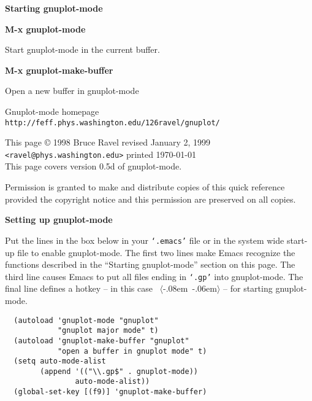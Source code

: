 \documentclass[twocolumn]{article}
\newenvironment{Boxedminipage}%
{\begin{Sbox}\begin{minipage}}%
  {\end{minipage}\end{Sbox}\Ovalbox{\TheSbox}}
\newenvironment{SqBoxedminipage}%
{\begin{Sbox}\begin{minipage}}%
  {\end{minipage}\end{Sbox}\fbox{\TheSbox}}
\def\version{{0.5d}}
\def\revised{{January 2, 1999}}
\def\file#1{{\texttt{`#1'}}}
\def\key#1{{\textrm \leavevmode\hbox{%
  \raise0.4pt\hbox{$\langle$}\kern-.08em\vtop{%
    \vbox{\hrule\kern-0.4pt
     \hbox{\raise0.4pt\hbox{\vphantom{$\langle$}}#1}}%
    \kern-0.4pt\hrule}%
  \kern-.06em\raise0.4pt\hbox{$\rangle$}}}}
\def\command#1#2{{
    \vspace{-0.2truecm}
    \begin{flushright}
      \begin{minipage}[h]{0.97\linewidth}
        \vspace{-0.2truecm}
        \textbf{#1}\hfill
        \begin{flushright}
          \begin{minipage}[h]{0.93\linewidth}
            \vspace{-0.4truecm}
            #2
          \end{minipage}
        \end{flushright}
      \end{minipage}
    \end{flushright}
    }}
\begin{document}
\vspace{4ex}

\centerline{{\large\textbf{Starting gnuplot-mode}}}
\vspace{2ex}

\command{M-x gnuplot-mode}{Start gnuplot-mode in the current buffer.}
%
\command{M-x gnuplot-make-buffer}{Open a new buffer in gnuplot-mode}



\vfill

\begin{Boxedminipage}{0.98\linewidth}
  \begin{center}
    \footnotesize{
      Gnuplot-mode homepage \\
      \texttt{http://feff.phys.washington.edu/\char126ravel/gnuplot/}}
  \end{center}
\end{Boxedminipage}
\begin{flushleft}
  {\footnotesize
    This page {\copyright} 1998 Bruce Ravel \hfill revised \revised \\
    \texttt{<ravel@phys.washington.edu>} \hfill printed \today \\
    This page covers version {\version} of gnuplot-mode.

    Permission is granted to make and distribute copies of this quick
    reference provided the copyright notice and this permission are
    preserved on all copies.}
\end{flushleft}
\pagebreak
\centerline{{\large\textbf{Setting up gnuplot-mode}}}
\vspace{2ex}

Put the lines in the box below in your \file{.emacs} file or in the
system wide start-up file to enable gnuplot-mode.  The first two lines
make Emacs recognize the functions described in the ``Starting
gnuplot-mode'' section on this page.  The third line causes Emacs to
put all files ending in \file{.gp} into gnuplot-mode.  The final line
defines a hotkey -- in this case \key{F9} -- for starting
gnuplot-mode.

\begin{SqBoxedminipage}{\linewidth}
\begin{Verbatim}
  (autoload 'gnuplot-mode "gnuplot"
            "gnuplot major mode" t)
  (autoload 'gnuplot-make-buffer "gnuplot"
            "open a buffer in gnuplot mode" t)
  (setq auto-mode-alist
        (append '(("\\.gp$" . gnuplot-mode))
                auto-mode-alist))
  (global-set-key [(f9)] 'gnuplot-make-buffer)
\end{Verbatim}%
\end{SqBoxedminipage}
\end{document}
